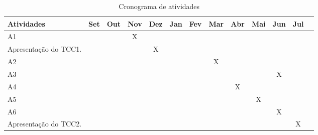 \begin{table}[ht]
    \centering
    \begin{tabular}{|l|c|c|c|c|c|c|c|c|c|c|c|c|}
    \hline
    \textbf{Atividades} & \textbf{Set} & \textbf{Out} & \textbf{Nov} & \textbf{Dez} & \textbf{Jan} & \textbf{Fev} & \textbf{Mar} & \textbf{Abr} & \textbf{Mai} & \textbf{Jun} & \textbf{Jul} \\ \hline
    A1  &   &   & X &   &   &   &   &   &   &   &   \\ \hline
    Apresentação do TCC1. &   &   &   & X &   &   &   &   &   &   &   \\ \hline
    A2  &   &   &   &   &   &   & X &   &   &   &   \\ \hline
    A3  &   &   &   &   &   &   &   &   &   & X &   \\ \hline
    A4  &   &   &   &   &   &   &   & X &   &   &   \\ \hline
    A5  &   &   &   &   &   &   &   &   & X &   &   \\ \hline
    A6  &   &   &   &   &   &   &   &   &   & X &   \\ \hline
    Apresentação do TCC2. &   &   &   &   &   &   &   &   &   &   & X \\ \hline
    \end{tabular}
    \caption{Cronograma de atividades}
    \label{tab:cronograma}
\end{table}